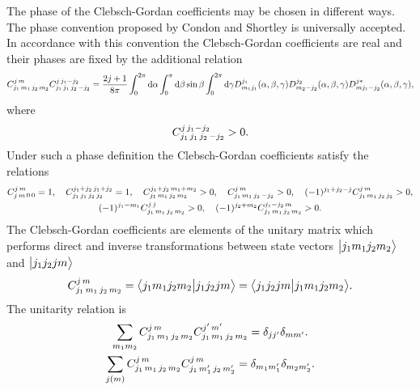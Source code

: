 The phase of the Clebsch-Gordan coefficients may be chosen in different ways. The phase convention proposed by Condon and Shortley \cite{ref010} is universally accepted. In accordance with this convention the Clebsch-Gordan
coefficients are real and their phases are fixed by the additional relation
\begin{equation}
C_{j_{1}\,m_{1}\,j_{2}\,m_{2}}^{j\,m} C_{j_{1}\,j_{1}\,j_{2}\,-j_{2}}^{j\,j_{1}-j_{2}}=\frac{2 j+1}{8 \pi} \int_{0}^{2 \pi}\mathrm{d} \alpha \int_{0}^{\pi}\mathrm{d} \beta \sin \beta \int_{0}^{2 \pi}\mathrm{d} \gamma D_{m_{1} j_{1}}^{j_{1}}(\alpha, \beta, \gamma) D_{m_{2}-j_{2}}^{j_{2}}(\alpha, \beta, \gamma) D_{m j_{1}-j_{2}}^{j *}(\alpha, \beta, \gamma), \label{eq:8:1:5}
\end{equation}
where
\[
C_{j_{1}\,j_{1}\,j_{2}\,-j_{2}}^{j\,j_{1}-j_{2}}>0 .
\]
Under such a phase definition the Clebsch-Gordan coefficients satisfy the relations
\begin{gather}
C_{j\,m\,0\,0}^{j\,m}=1, \quad C_{j_{1}\,j_{1}\,j_{2}\,j_{2}}^{j_{1}+j_{2}\,j_{1}+j_{2}}=1, \quad C_{j_{1}\,m_{1}\,j_{2}\,m_{2}}^{j_{1}+j_{2}\,m_{1}+m_{2}}>0, \quad C_{j_{1}\,m_{1}\,j_{2}\,-j_{2}}^{j\,m}>0, \quad(-1)^{j_{1}+j_{2}-j} C_{j_{1}\,m_{1}\,j_{2}\,j_{2}}^{j\,m}>0, \notag\\
(-1)^{j_{1}-m_{1}} C_{j_{1}\,m_{1}\,j_{2}\,m_{2}}^{j\,j}>0, \quad(-1)^{j_{2}+m_{2}} C_{j_{1}\,m_{1}\,j_{2}\,m_{2}}^{j_{1}-j_{2}\,m}>0 . \label{eq:8:1:6}
\end{gather}
The Clebsch-Gordan coefficients are elements of the unitary matrix which performs direct and inverse transformations between state vectors $\bigl| j_{1} m_{1} j_{2} m_{2} \bigr\rangle$ and $\bigl| j_{1} j_{2} j m \bigr\rangle$
\begin{equation}
C_{j_{1}\,m_{1}\,j_{2}\,m_{2}}^{j\,m}=\bigl\langle j_{1} m_{1} j_{2} m_{2} \big| j_{1} j_{2} j m \bigr\rangle=\bigl\langle j_{1} j_{2} j m \big| j_{1} m_{1} j_{2} m_{2} \bigr\rangle . \label{eq:8:1:7}
\end{equation}
The unitarity relation is
\begin{gather}
\sum_{m_{1} m_{2}} C_{j_{1}\,m_{1}\,j_{2}\,m_{2}}^{j\,m} C_{j_{1}\,m_{1}\,j_{2}\,m_{2}}^{j^{\prime}\,m^{\prime}}=\delta_{j j^{\prime}} \delta_{m m^{\prime}}. \notag\\
\sum_{j(m)} C_{j_{1}\,m_{1}\,j_{2}\,m_{2}}^{j\,m} C_{j_{1}\,m_{1}^{\prime}\,j_{2}\,m_{2}^{\prime}}^{j\,m}=\delta_{m_{1} m_{1}^{\prime}} \delta_{m_{2} m_{2}^{\prime}}. \label{eq:8:1:8}
\end{gather}
